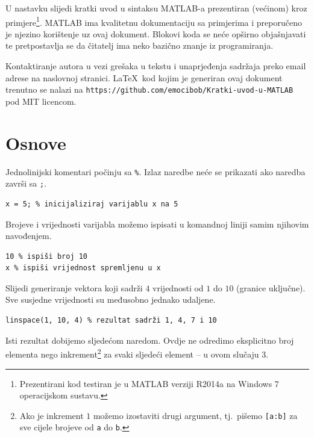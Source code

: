\documentclass[a4paper, 10pt]{article}
\begin{document}
U nastavku slijedi kratki uvod u sintaksu MATLAB-a prezentiran (većinom) kroz primjere\footnote{Prezentirani kod testiran je u MATLAB verziji R2014a na Windows 7 operacijskom sustavu.}.
MATLAB ima kvalitetnu dokumentaciju sa primjerima i preporučeno je njezino korištenje uz ovaj dokument.
Blokovi koda se neće opširno objašnjavati te pretpostavlja se da čitatelj ima neko bazično znanje iz programiranja.

Kontaktiranje autora u vezi grešaka u tekstu i unaprjeđenja sadržaja preko email adrese na naslovnoj stranici.
\LaTeX\ kod kojim je generiran ovaj dokument trenutno se nalazi na \texttt{https://github.com/emocibob/Kratki-uvod-u-MATLAB} pod MIT licencom.

\clearpage


\section{Osnove}


Jednolinijski komentari počinju sa \texttt{\%}.
Izlaz naredbe neće se prikazati ako naredba završi sa \texttt{;}.

\begin{lstlisting}
x = 5; % inicijaliziraj varijablu x na 5
\end{lstlisting}

Brojeve i vrijednosti varijabla možemo ispisati u komandnoj liniji samim njihovim navođenjem.

\begin{lstlisting}
10 % ispiši broj 10
x % ispiši vrijednost spremljenu u x
\end{lstlisting}

Slijedi generiranje vektora koji sadrži $4$ vrijednosti od $1$ do $10$ (granice uključne).
Sve susjedne vrijednosti su međusobno jednako udaljene.

\begin{lstlisting}
linspace(1, 10, 4) % rezultat sadrži 1, 4, 7 i 10
\end{lstlisting}

Isti rezultat dobijemo sljedećom naredom.
Ovdje ne odredimo eksplicitno broj elementa nego inkrement\footnote{Ako je inkrement $1$ možemo izostaviti drugi argument, tj.\ pišemo \texttt{[a:b]} za sve cijele brojeve od \texttt{a} do \texttt{b}.} za svaki sljedeći element -- u ovom slučaju $3$.
\end{document}
